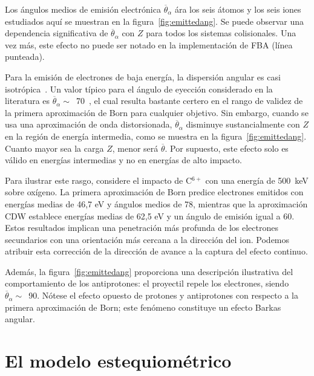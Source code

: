 Los ángulos medios de emisión electrónica $\overline{\theta}_{\alpha}$ 
ára los seis átomos y los seis iones estudiados aquí se muestran en la 
figura~\ref{fig:emittedang}. Se puede observar una dependencia 
significativa de $\overline{\theta}_{\alpha}$ con $Z$ para todos los 
sistemas colisionales. Una vez más, este efecto no puede ser notado en 
la implementación de FBA (línea punteada).

Para la emisión de electrones de baja energía, la dispersión angular 
es casi isotrópica~\cite{Rudd1992}. Un valor típico para el ángulo de 
eyección considerado en la literatura es 
$\overline{\theta}_{\alpha}\sim$~70\textdegree~\cite{surdutovic2018}, el cual
resulta bastante certero en el rango de validez de la primera 
aproximación de Born para cualquier objetivo. Sin embargo, cuando se 
usa una aproximación de onda distorsionada, $\overline{\theta}_{\alpha}$
disminuye sustancialmente con $Z$ en la región de energía intermedia, 
como se muestra en la figura~\ref{fig:emittedang}. Cuanto mayor sea la 
carga $Z$, menor será $\overline{\theta}$. Por supuesto, este efecto 
solo es válido en energías intermedias y no en energías de alto impacto.

Para ilustrar este rasgo, considere el impacto de C$^{6+}$ con una 
energía de 500~keV sobre oxígeno. La primera aproximación de Born 
predice electrones emitidos con energías medias de 46,7 eV y ángulos 
medios de 78\textdegree, mientras que la aproximación CDW establece 
energías medias de 62,5 eV y un ángulo de emisión igual a 60\textdegree. 
Estos resultados implican una penetración más profunda de los electrones 
secundarios con una orientación más cercana a la dirección del ion. 
Podemos atribuir esta corrección de la dirección de avance a la captura 
del efecto continuo.

Además, la figura~\ref{fig:emittedang} proporciona una descripción 
ilustrativa del comportamiento de los antiprotones: el proyectil repele 
los electrones, siendo $\overline{\theta}_{\alpha}\sim$~90\textdegree. 
Nótese el efecto opuesto de protones y antiprotones con respecto a la 
primera aproximación de Born; este fenómeno constituye un efecto Barkas 
angular.

\section{El modelo estequiométrico}
\label{sec:SSM}

